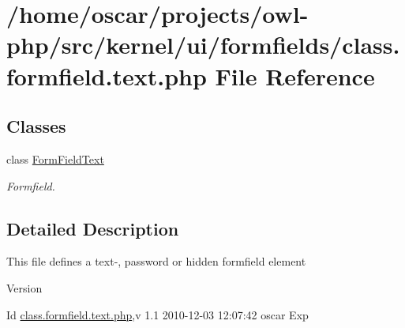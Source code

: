 \section{/home/oscar/projects/owl-\/php/src/kernel/ui/formfields/class.formfield.text.php File Reference}
\label{class_8formfield_8text_8php}
\subsection*{Classes}
\begin{DoxyCompactItemize}
\item 
class \hyperlink{classFormFieldText}{FormFieldText}
\begin{DoxyCompactList}\small\item\em Formfield. \item\end{DoxyCompactList}\end{DoxyCompactItemize}


\subsection{Detailed Description}
This file defines a text-\/, password or hidden formfield element \begin{DoxyVersion}{Version}

\end{DoxyVersion}
\begin{DoxyParagraph}{Id}
\hyperlink{class_8formfield_8text_8php}{class.formfield.text.php},v 1.1 2010-\/12-\/03 12:07:42 oscar Exp 
\end{DoxyParagraph}
